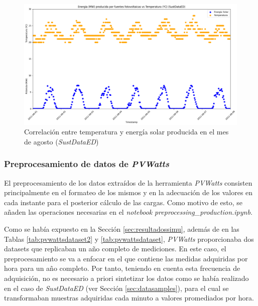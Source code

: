 \begin{figure}[h!]
  \centering
  \includegraphics[width=1\textwidth]{img/diseno/energiavstemp.png}
  \caption{Correlación entre temperatura y energía solar producida en el mes de agosto (\textit{SustDataED})}
  \label{fig:energiavstemp}
\end{figure}

\subsubsection{Preprocesamiento de datos de \textit{PVWatts}}
\label{sec:preprocpvwatts}

El preprocesamiento de los datos extraídos de la herramienta \textit{PVWatts} consisten principalmente en el formateo de los mismos y en la adecuación de los valores en cada instante para el posterior cálculo de las cargas. Como motivo de esto, se añaden las operaciones necesarias en el \textit{notebook} \textit{preprocessing\_production.ipynb}. 

\vspace{3mm}

Como se había expuesto en la Sección \ref{sec:resultadossimu}, además de en las Tablas \ref{tab:pvwattsdataset2} y \ref{tab:pvwattsdataset}, \textit{PVWatts} proporcionaba dos datasets que replicaban un año completo de mediciones. En este caso, el preprocesamiento se va a enfocar en el que contiene las medidas adquiridas por hora para un año completo. Por tanto, teniendo en cuenta esta frecuencia de adquisición, no es necesario a priori sintetizar los datos como se había realizado en el caso de \textit{SustDataED} (ver Sección \ref{sec:datasamples}), para el cual se transformaban muestras adquiridas cada minuto a valores promediados por hora.

\vspace{3mm}

